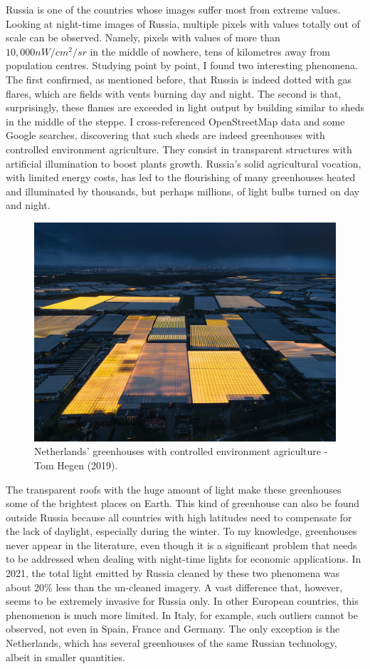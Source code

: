  Russia is one of the countries whose images suffer most from extreme values. Looking at night-time images of Russia, multiple pixels with values totally out of scale can be observed. Namely, pixels with values of more than $10,000nW/cm^2/sr$ in the middle of nowhere, tens of kilometres away from population centres.
Studying point by point, I found two interesting phenomena. The first confirmed, as mentioned before, that Russia is indeed dotted with gas flares, which are fields with vents burning day and night. The second is that, surprisingly, these flames are exceeded in light output by building similar to sheds in the middle of the steppe. I cross-referenced OpenStreetMap data and some Google searches, discovering that such sheds are indeed greenhouses  with controlled environment agriculture. They consist in transparent structures with artificial illumination to boost plants growth.
Russia's solid agricultural vocation, with limited energy costs, has led to the flourishing of many greenhouses heated and illuminated by thousands, but perhaps millions, of light bulbs turned on day and night. 
\begin{figure}
    \hspace*{-1.8cm}
    \centering
    \includegraphics[width=15cm]{images/greenhousehegen.jpg}
    \caption{Netherlands' greenhouses with controlled environment agriculture - Tom Hegen (2019).}
    \label{fig:my_label}
\end{figure}
The transparent roofs with the huge amount of light make these greenhouses some of the brightest places on Earth. This kind of greenhouse can also be found outside Russia because all countries with high latitudes need to compensate for the lack of daylight, especially during the winter. To my knowledge, greenhouses never appear in the literature, even though it is a significant problem that needs to be addressed when dealing with night-time lights for economic applications. In 2021, the total light emitted by Russia cleaned by these two phenomena was about 20\% less than the un-cleaned imagery. A vast difference that, however, seems to be extremely invasive for Russia only. In other European countries, this phenomenon is much more limited. In Italy, for example, such outliers cannot be observed, not even in Spain, France and Germany. The only exception is the Netherlands, which has several greenhouses of the same Russian technology, albeit in smaller quantities.
